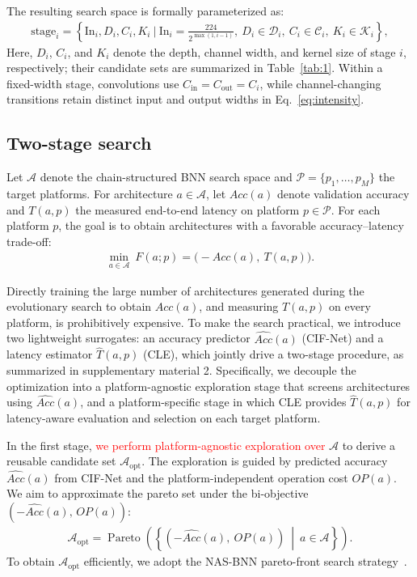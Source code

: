 \documentclass[a4paper,fleqn]{cas-sc}
\begin{document}
The resulting search space is formally parameterized as:
\begin{align}
\text{stage}_i =
\left\{
\text{In}_i, D_i, C_i, K_i
~\Big|~
\text{In}_i = \frac{224}{2^{\max(1,i-1)}},~
D_i\in\mathcal{D}_i,~
C_i\in\mathcal{C}_i,~
K_i\in\mathcal{K}_i
\right\},
\label{eq:define_stage}
\end{align}
Here, $D_i$, $C_i$, and $K_i$ denote the depth, channel width, and kernel size of stage $i$, respectively; their candidate sets are summarized in Table~\ref{tab:1}. Within a fixed-width stage, convolutions use $C_{\mathrm{in}}=C_{\mathrm{out}}=C_i$, while channel-changing transitions retain distinct input and output widths in Eq.~\ref{eq:intensity}.

\subsection{Two-stage search}\label{sec:two_stage}
Let $\mathcal{A}$ denote the chain-structured BNN search space and $\mathcal{P}=\{p_1,\dots,p_M\}$ the target platforms. For architecture $a\in\mathcal{A}$, let $Acc(a)$ denote validation accuracy and $T(a,p)$ the measured end-to-end latency on platform $p\in\mathcal{P}$. For each platform $p$, the goal is to obtain architectures with a favorable accuracy--latency trade-off:
\begin{align}
\min_{a\in\mathcal{A}}~F(a;p)=\big(-Acc(a),~T(a,p)\big).
\label{eq:mo_true}
\end{align}

Directly training the large number of architectures generated during the evolutionary search to obtain $Acc(a)$, and measuring $T(a,p)$ on every platform, is prohibitively expensive. To make the search practical, we introduce two lightweight surrogates: an accuracy predictor $\widehat{Acc}(a)$ (CIF-Net) and a latency estimator $\hat{T}(a,p)$ (CLE), which jointly drive a two-stage procedure, as summarized in supplementary material 2. Specifically, we decouple the optimization into a platform-agnostic exploration stage that screens architectures using $\widehat{Acc}(a)$, and a platform-specific stage in which CLE provides $\hat{T}(a,p)$ for latency-aware evaluation and selection on each target platform.

In the first stage, \textcolor{red}{we perform platform-agnostic exploration over} $\mathcal{A}$ to derive a reusable candidate set $\mathcal{A}_{\text{opt}}$. The exploration is guided by predicted accuracy $\widehat{Acc}(a)$ from CIF-Net and the platform-independent operation cost $OP(a)$.
We aim to approximate the pareto set under the bi-objective $(-\widehat{Acc}(a),\,OP(a))$:
\begin{align}
\mathcal{A}_{\text{opt}}
=
\operatorname{Pareto}\!\left(
\left\{ (-\widehat{Acc}(a),~ OP(a)) ~\middle|~ a \in \mathcal{A} \right\}
\right).
\label{eq:aopt}
\end{align}
To obtain $\mathcal{A}_{\text{opt}}$ efficiently, we adopt the NAS-BNN pareto-front search strategy~\cite{Lin2025}.
\end{document}
